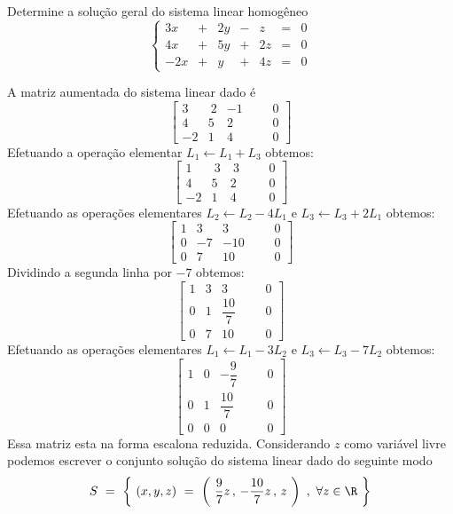 \begin{problem}
Determine a solução geral do sistema linear homogêneo
$$\left\{ \begin{array}{rrrrrrr}
 3x & + & 2y & - &  z & = & 0 \\
 4x & + & 5y & + & 2z & = & 0 \\
-2x & + &  y & + & 4z & = & 0 \end{array} \right.$$
\end{problem}
\begin{solution}
A matriz aumentada do sistema linear dado é 
$$ \left[\begin{array}{rrrr|rr}
	3 & \ 2 &  -1    & & &    0      \\
	4 &   5 &   2    & & &    0      \\ 
 -2 &   1 &   4    & & &    0      \end{array}\right] $$
Efetuando a operação elementar $L_1 \leftarrow L_1 + L_3$ obtemos:
$$ \left[\begin{array}{rrrr|rr}
	1 & \ 3 & \ 3    & & &    0      \\
	4 &   5 &   2    & & &    0      \\ 
 -2 &   1 &   4    & & &    0      \end{array}\right] $$
Efetuando as operações elementares $L_2 \leftarrow L_2 - 4L_1$ e $L_3 \leftarrow L_3 + 2L_1$ obtemos:
$$ \left[\begin{array}{rrrr|rr}
	1 &   3 &    3    & & &    0      \\
	0 &  -7 &  -10    & & &    0      \\ 
	0 &   7 &   10    & & &    0      \end{array}\right] $$
Dividindo a segunda linha por $-7$ obtemos:
$$ \left[\begin{array}{rrrr|rr}
	1 &   3 &    3              & & &    0      \\[-2pt]
	0 &   1 &  \dfrac{10}{7}    & & &    0      \\[-2pt]
	0 &   7 &   10              & & &    0      \end{array}\right] $$
Efetuando as operações elementares $L_1 \leftarrow L_1 - 3L_2$ e $L_3 \leftarrow L_3 - 7L_2$ obtemos:
$$ \left[\begin{array}{rrrr|rr}
	1 &   0 &  -\dfrac{9}{7}     & & &    0      \\[-2pt]
	0 &   1 &   \dfrac{10}{7}    & & &    0      \\[-2pt]
	0 &   0 &   0                & & &    0      \end{array}\right] $$
Essa matriz esta na forma escalona reduzida. Considerando $z$ como variável livre \linebreak 
podemos escrever o conjunto solução do sistema linear dado do seguinte modo
$$S\ =\ \left\{\ (x,y,z)\ =\ \left( \ \dfrac{9}{7}z\, ,\, -\dfrac{10}{7}z\, ,\, z\  \right)\ , \ \forall z \in \R\ \right\}$$
\end{solution}


